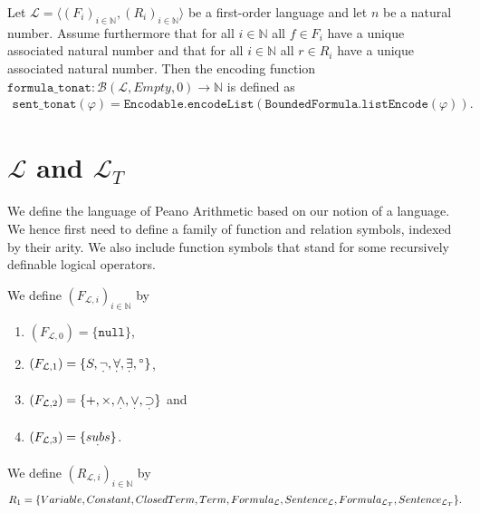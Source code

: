 \begin{definition}\label{def:S-To-N}
  \leanok
    Let $\mathcal{L} = \langle (F_i)_{i \in \mathbb{N}}, (R_i)_{i \in \mathbb{N}} \rangle$ be a first-order language and let $n$ be a natural number. Assume furthermore that for all $i \in \mathbb{N}$ all $f \in F_i$ have a unique associated natural number and that for all $i \in \mathbb{N}$ all $r \in R_i$ have a unique associated natural number. Then the encoding function $\texttt{formula\_tonat} : \mathcal{B}(\mathcal{L},Empty,0) \to \mathbb{N}$ is defined as 
    \begin{align*}
        \texttt{sent\_tonat}(\varphi) = \texttt{Encodable.encodeList}(\texttt{BoundedFormula.listEncode}(\varphi)).
    \end{align*}
\end{definition}


\section{$\mathcal{L}$ and $\mathcal{L}_T$}\label{subsec:lpa-lt}
We define the language of Peano Arithmetic based on our notion of a language. We hence first need to define a family of function and relation symbols, indexed by their arity. We also include function symbols that stand for some recursively definable logical operators.

\begin{definition}\label{def:L-Func}
  \leanok
  We define $(F_{\mathcal{L},i})_{i \in \mathbb{N}}$ by
  \begin{enumerate}
  \item $(F_{\mathcal{L},0}) = \{\texttt{null}\}$,
  \item $(F_{\mathcal{L},1}) = \{S, \underset{^{\boldsymbol{\cdot}}}{\neg} , \underset{^{\boldsymbol{\cdot}}}{\forall}, \underset{^{\boldsymbol{\cdot}}}{\exists}, {^\circ}\}$,
  \item $(F_{\mathcal{L},2}) = \{+,\times, \underset{^{\boldsymbol{\cdot}}}{\wedge}, \underset{^{\boldsymbol{\cdot}}}{\vee}, \underset{^{\boldsymbol{\cdot}}}{\supset}\}$ and
  \item $(F_{\mathcal{L},3}) = \{\underset{^{\boldsymbol{\cdot}}}{subs}\}$.
  \end{enumerate}
\end{definition}

\begin{definition}\label{def:L-Rel}
  \leanok
  We define $(R_{\mathcal{L},i})_{i \in \mathbb{N}}$ by \[R_1 = \{Variable, Constant, ClosedTerm, Term, Formula_{\mathcal{L}}, Sentence_{\mathcal{L}}, \\ Formula_{\mathcal{L}_T}, Sentence_{\mathcal{L}_T}\}.\]
\end{definition}

